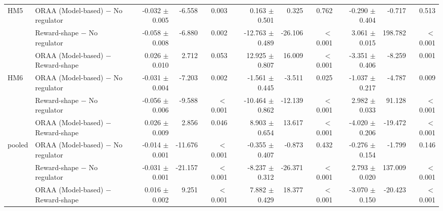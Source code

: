 \begin{tabular}{llrrrrrrrrr}
\addlinespace
HM5 & ORAA (Model-based) $-$ No regulator & -0.032 $\pm$ 0.005 & -6.558 & 0.003 & 0.163 $\pm$ 0.501 & 0.325 & 0.762 & -0.290 $\pm$ 0.404 & -0.717 & 0.513 \\
 & Reward-shape $-$ No regulator & -0.058 $\pm$ 0.008 & -6.880 & 0.002 & -12.763 $\pm$ 0.489 & -26.106 & $<$0.001 & 3.061 $\pm$ 0.015 & 198.782 & $<$0.001 \\
 & ORAA (Model-based) $-$ Reward-shape & 0.026 $\pm$ 0.010 & 2.712 & 0.053 & 12.925 $\pm$ 0.807 & 16.009 & $<$0.001 & -3.351 $\pm$ 0.406 & -8.259 & 0.001 \\
\addlinespace
HM6 & ORAA (Model-based) $-$ No regulator & -0.031 $\pm$ 0.004 & -7.203 & 0.002 & -1.561 $\pm$ 0.445 & -3.511 & 0.025 & -1.037 $\pm$ 0.217 & -4.787 & 0.009 \\
 & Reward-shape $-$ No regulator & -0.056 $\pm$ 0.006 & -9.588 & $<$0.001 & -10.464 $\pm$ 0.862 & -12.139 & $<$0.001 & 2.982 $\pm$ 0.033 & 91.128 & $<$0.001 \\
 & ORAA (Model-based) $-$ Reward-shape & 0.026 $\pm$ 0.009 & 2.856 & 0.046 & 8.903 $\pm$ 0.654 & 13.617 & $<$0.001 & -4.020 $\pm$ 0.206 & -19.472 & $<$0.001 \\
\addlinespace
pooled & ORAA (Model-based) $-$ No regulator & -0.014 $\pm$ 0.001 & -11.676 & $<$0.001 & -0.355 $\pm$ 0.407 & -0.873 & 0.432 & -0.276 $\pm$ 0.154 & -1.799 & 0.146 \\
 & Reward-shape $-$ No regulator & -0.031 $\pm$ 0.001 & -21.157 & $<$0.001 & -8.237 $\pm$ 0.312 & -26.371 & $<$0.001 & 2.793 $\pm$ 0.020 & 137.009 & $<$0.001 \\
 & ORAA (Model-based) $-$ Reward-shape & 0.016 $\pm$ 0.002 & 9.251 & $<$0.001 & 7.882 $\pm$ 0.429 & 18.377 & $<$0.001 & -3.070 $\pm$ 0.150 & -20.423 & $<$0.001 \\
\bottomrule
\end{tabular}
